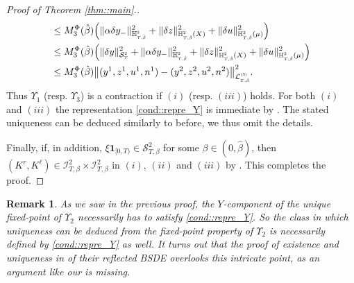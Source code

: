 \documentclass[10pt]{article} %
\newtheorem{remark}[theorem]{Remark}
\newcommand\cI{\mathcal I}
\newcommand\cL{\mathcal L}
\newcommand\cS{\mathcal S}
\newcommand{\smalltext}[1]{\text{\fontsize{4}{4}\selectfont$#1$}}
\def \H{\mathbb{H}}
\newcommand{\1}{\mathbf{1}}
\begin{document}
\begin{proof}[Proof of Theorem \ref{thm::main}.]
\begin{align*}
		&\leq M^\Phi_3(\hat\beta) \Big(\|\alpha\delta y_-\|^2_{\H^\smalltext{2}_{\smalltext{T}\smalltext{,}\smalltext{\hat\beta}}} + \|\delta z\|^2_{\H^\smalltext{2}_{\smalltext{T}\smalltext{,}\smalltext{\hat\beta}}(X)} + \|\delta u\|^2_{\H^\smalltext{2}_{\smalltext{T}\smalltext{,}\smalltext{\hat\beta}}(\mu)} \Big)  \nonumber\\
		&\leq M^\Phi_3(\hat\beta) \Big( \|\delta y\|^2_{\cS^\smalltext{2}_\smalltext{T}} + \|\alpha\delta y_-\|^2_{\H^\smalltext{2}_{\smalltext{T}\smalltext{,}\smalltext{\hat\beta}}} + \|\delta z\|^2_{\H^\smalltext{2}_{\smalltext{T}\smalltext{,}\smalltext{\hat\beta}}(X)} + \|\delta u\|^2_{\H^\smalltext{2}_{\smalltext{T}\smalltext{,}\smalltext{\hat\beta}}(\mu)} \Big)  \nonumber\\
		&\leq M^\Phi_3(\hat\beta)\big\|(y^1, z^1, u^1, n^1) - (y^2, z^2, u^2, n^2)\big\|^2_{\cL^\smalltext{(3)}_{\smalltext{T}\smalltext{,}\smalltext{\hat\beta}}}.
	\end{align*} 
	Thus $\Upsilon_1$ (resp. $\Upsilon_3$) is a contraction if $(i)$ (resp. $(iii)$) holds. For both $(i)$ and $(iii)$ the representation \ref{cond::repre_Y} is immediate by . The stated uniqueness can be deduced similarly to before, we thus omit the details.
	
	\medskip
	Finally, if, in addition, $\xi\mathbf{1}_{[0,T)} \in \cS^2_{T,\beta}$ for some $\beta \in (0,\hat\beta)$, then $(K^r,K^\ell) \in \cI^2_{T,\beta} \times \cI^2_{T,\beta}$ in $(i)$, $(ii)$ and $(iii)$ by . This completes the proof.
\end{proof}


\begin{remark}\label{rem::missing_pieces}
	As we saw in the previous proof, the $Y$-component of the unique fixed-point of $\Upsilon_2$ necessarily has to satisfy \ref{cond::repre_Y}. So the class in which uniqueness can be deduced from the fixed-point property of $\Upsilon_2$ is necessarily defined by \ref{cond::repre_Y} as well. It turns out that the proof of existence and uniqueness in {\rm\cite{grigorova2020optimal}} of their reflected {\rm BSDE} overlooks this intricate point, as an argument like our {\rm{}} is missing.
\end{remark}
\end{document}
